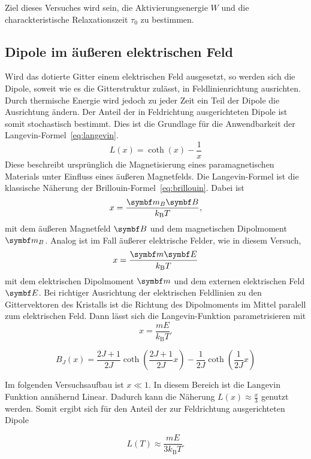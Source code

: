 Ziel dieses Versuches wird sein, die Aktivierungsenergie $W$ und die charackteristische Relaxationszeit $τ_0$ zu bestimmen.

\subsection{Dipole im äußeren elektrischen Feld }

Wird das dotierte Gitter einem elektrischen Feld ausgesetzt, so werden sich die Dipole,
soweit wie es die Gitterstruktur zulässt, in Feldlinienrichtung ausrichten.
Durch thermische Energie wird jedoch zu jeder Zeit ein Teil der Dipole die Ausrichtung ändern.
Der Anteil der in Feldrichtung ausgerichteten Dipole ist somit stochastisch bestimmt.
Dies ist die Grundlage für die Anwendbarkeit der Langevin-Formel~\eqref{eq:langevin}.
\begin{equation}
  \label{eq:langevin}
  L(x) = \coth(x) - \frac{1}{x}
\end{equation}
Diese beschreibt ursprünglich die Magnetisierung eines paramagnetischen Materials unter Einfluss eines äußeren Magnetfelds.
Die Langevin-Formel ist die klassische
Näherung der Brillouin-Formel~\eqref{eq:brillouin}.
Dabei ist
\begin{equation}
  x = \frac{\v{m}_B \v{B}}{k_\text{B} T},
\end{equation}
mit dem äußeren Magnetfeld $\v{B}$ und dem magnetischen Dipolmoment $\v{m}_B$.
Analog ist im Fall äußerer elektrische Felder, wie in diesem Versuch,
\begin{equation}
  x = \frac{\v{m} \v{E}}{k_\text{B} T}
\end{equation}
mit dem elektrischen Dipolmoment $\v{m}$ und dem externen elektrischen Feld $\v{E}$.
Bei richtiger Ausrichtung der elektrischen Feldlinien zu den Gittervektoren des Kristalls ist die Richtung des Dipolmoments im Mittel paralell zum elektrischen Feld.
Dann lässt sich die Langevin-Funktion parametrisieren mit
\begin{equation}
  x= \frac{m E}{k_\text{B} T}.
\end{equation}

\begin{equation}
  B_J(x) =   \frac{2J + 1}{2J} \coth\!\left( \frac{2J + 1}{2J} x \right)
           - \frac{1}{2J} \coth\!\left(\frac{1}{2J} x \right)
  \label{eq:brillouin}
\end{equation}


%


Im folgenden Versuchsaufbau ist $ x \ll 1 $. In diesem Bereich ist die Langevin Funktion annähernd Linear.
Dadurch kann die Näherung $L(x) \approx \frac{x}{3}$ genutzt werden.
Somit ergibt sich für den Anteil der zur Feldrichtung ausgerichteten Dipole

\begin{equation}
  L(T) \approx \frac{m E}{3 k_\text{B} T}.
  \label{eq:dipoles}
\end{equation}
